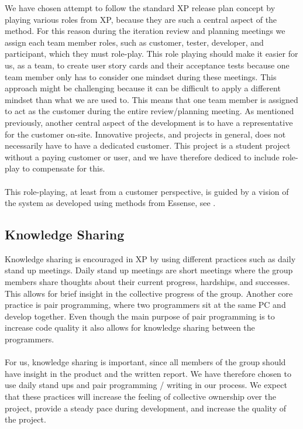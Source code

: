 We have chosen attempt to follow the standard XP release plan concept by playing various roles from XP, because they are such a central aspect of the method. For this reason during the iteration review and planning meetings we assign each team member roles, such as customer, tester, developer, and participant, which they must role-play. This role playing should make it easier for us, as a team, to create user story cards and their acceptance tests because one team member only has to consider one mindset during these meetings. This approach might be challenging because it can be difficult to apply a different mindset than what we are used to. This means that one team member is assigned to act as the customer during the entire review/planning meeting. As mentioned previously, another central aspect of the development is to have a representative for the customer on-site. Innovative projects, and projects in general, does not necessarily have to have a dedicated customer. This project is a student project without a paying customer or user, and we have therefore dediced to include role-play to compensate for this. 
\\\\
This role-playing, at least from a customer perspective, is guided by a vision of the system as developed using methods from Essense, see .

\subsection{Knowledge Sharing}
\label{sub:knowledge_sharing}
Knowledge sharing is encouraged in XP by using different practices such as daily stand up meetings. Daily stand up meetings are short meetings where the group members share thoughts about their current progress, hardships, and successes. This allows for brief insight in the collective progress of the group. Another core practice is pair programming, where two programmers sit at the same PC and develop together. Even though the main purpose of pair programming is to increase code quality it also allows for knowledge sharing between the programmers. 
\\\\ 
For us, knowledge sharing is important, since all members of the group should have insight in the product and the written report. We have therefore chosen to use daily stand ups and pair programming / writing in our process. We expect that these practices will increase the feeling of collective ownership over the project, provide a steady pace during development, and increase the quality of the project. 

